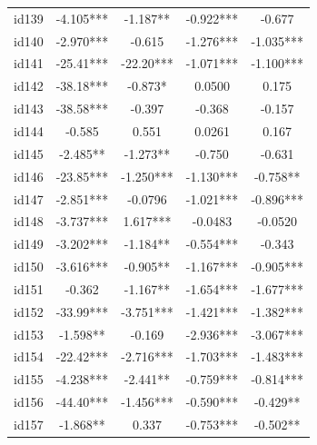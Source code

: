 \documentclass[num-refs]{wiley-article}
\begin{document}
\begin{center}
\begin{longtable}{ccccc}
id139                    & -4.105*** & -1.187**       & -0.922***         & -0.677            \\
id140                    & -2.970*** & -0.615         & -1.276***         & -1.035***         \\
id141                    & -25.41*** & -22.20***      & -1.071***         & -1.100***         \\
id142                    & -38.18*** & -0.873*        & 0.0500            & 0.175             \\
id143                    & -38.58*** & -0.397         & -0.368            & -0.157            \\
id144                    & -0.585    & 0.551          & 0.0261            & 0.167             \\
id145                    & -2.485**  & -1.273**       & -0.750            & -0.631            \\
id146                    & -23.85*** & -1.250***      & -1.130***         & -0.758**          \\
id147                    & -2.851*** & -0.0796        & -1.021***         & -0.896***         \\
id148                    & -3.737*** & 1.617***       & -0.0483           & -0.0520           \\
id149                    & -3.202*** & -1.184**       & -0.554***         & -0.343            \\
id150                    & -3.616*** & -0.905**       & -1.167***         & -0.905***         \\
id151                    & -0.362    & -1.167**       & -1.654***         & -1.677***         \\
id152                    & -33.99*** & -3.751***      & -1.421***         & -1.382***         \\
id153                    & -1.598**  & -0.169         & -2.936***         & -3.067***         \\
id154                    & -22.42*** & -2.716***      & -1.703***         & -1.483***         \\
id155                    & -4.238*** & -2.441**       & -0.759***         & -0.814***         \\
id156                    & -44.40*** & -1.456***      & -0.590***         & -0.429**          \\
id157                    & -1.868**  & 0.337          & -0.753***         & -0.502**          \\

\end{longtable}
\end{center}
\end{document}
